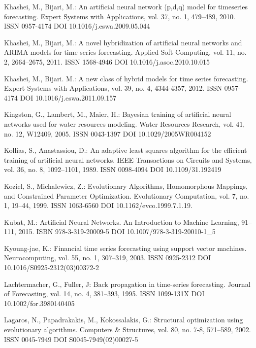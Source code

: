 \begin{thebibliography}{99.}
 Khashei, M., Bijari, M.: An artificial neural network (p,d,q) model for timeseries forecasting. Expert Systems with Applications, vol. 37, no. 1, 479--489, 2010. ISSN 0957-4174 DOI 10.1016/j.eswa.2009.05.044

 Khashei, M., Bijari, M.: A novel hybridization of artificial neural networks and ARIMA models for time series forecasting. Applied Soft Computing, vol. 11, no. 2, 2664--2675, 2011. ISSN 1568-4946 DOI 10.1016/j.asoc.2010.10.015

 Khashei, M., Bijari. M.: A new class of hybrid models for time series forecasting. Expert Systems with Applications, vol. 39, no. 4, 4344-4357, 2012. ISSN 0957-4174 DOI 10.1016/j.eswa.2011.09.157

 Kingston, G., Lambert, M., Maier, H.: Bayesian training of artificial neural networks used for water resources modeling. Water Resources Research, vol. 41, no. 12, W12409, 2005. ISSN 0043-1397 DOI 10.1029/2005WR004152

 Kollias, S., Anastassiou, D.: An adaptive least squares algorithm for the efficient training of artificial neural networks. IEEE Transactions on Circuits and Systems, vol. 36, no. 8, 1092--1101, 1989. ISSN 0098-4094 DOI 10.1109/31.192419

 Koziel, S., Michalewicz, Z.: Evolutionary Algorithms, Homomorphous Mappings, and Constrained Parameter Optimization. Evolutionary Computation, vol. 7, no. 1, 19--44, 1999. ISSN 1063-6560 DOI 10.1162/evco.1999.7.1.19.

 Kubat, M.: Artificial Neural Networks. An Introduction to Machine Learning, 91--111, 2015. ISBN 978-3-319-20009-5 DOI 10.1007/978-3-319-20010-1\_5

 Kyoung-jae, K.: Financial time series forecasting using support vector machines. Neurocomputing, vol. 55, no. 1, 307--319, 2003. ISSN 0925-2312 DOI 10.1016/S0925-2312(03)00372-2

 Lachtermacher, G., Fuller, J: Back propagation in time-series forecasting. Journal of Forecasting, vol. 14, no. 4, 381--393, 1995. ISSN 1099-131X DOI 10.1002/for.3980140405

 Lagaros, N., Papadrakakis, M., Kokossalakis, G.: Structural optimization using evolutionary algorithms. Computers \& Structures, vol. 80, no. 7-8, 571--589, 2002. ISSN 0045-7949 DOI S0045-7949(02)00027-5


\end{thebibliography}
